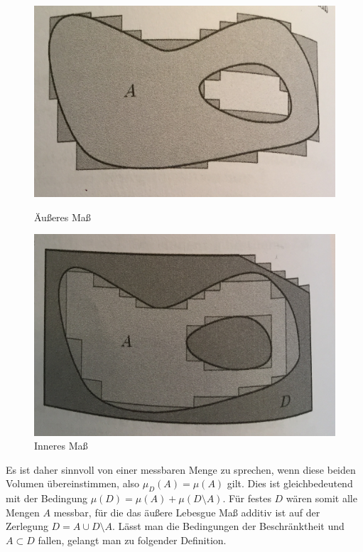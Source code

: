\begin{figure}[!tbp]
  \centering
  \begin{minipage}[b]{0.49\textwidth}
    \includegraphics[width=1.0\textwidth]{images/am}
    \caption{Äußeres Maß}
  \end{minipage}
  \hfill
  \begin{minipage}[b]{0.49\textwidth}
    \includegraphics[width=1.0\textwidth]{images/im}
    \caption{Inneres Maß}
  \end{minipage}
\end{figure}

Es ist daher sinnvoll von einer messbaren Menge zu sprechen, wenn diese beiden Volumen übereinstimmen, also
$\mu_D(A) = \mu(A)$ gilt. Dies ist gleichbedeutend mit der Bedingung $\mu(D) = \mu(A) + \mu(D  \setminus A)$. 
Für festes $D$ wären somit alle Mengen $A$ messbar, für die das äußere Lebesgue Maß additiv ist auf der Zerlegung $D = A \cup D \setminus A$. 
Lässt man die Bedingungen der Beschränktheit und $A \subset D$ fallen, gelangt man zu folgender Definition.

